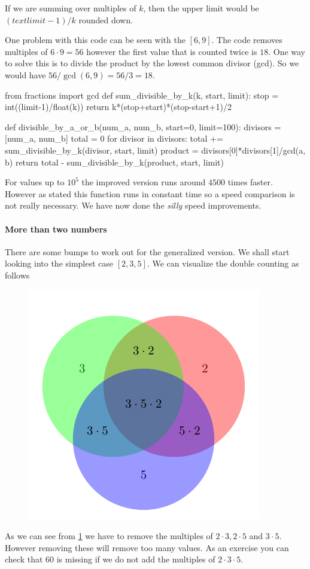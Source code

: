 If we are summing over multiples of $k$, then the upper limit would be $(text{limit}-1)/k$ rounded down.

One problem with this code can be seen with the $[6, 9]$. The code removes multiples of $6 \cdot 9 = 56$ however the 
first value that is counted twice is $18$. One way to solve this is to divide the product by the lowest common divisor (gcd). 
So we would have $56/\gcd(6,9) = 56/3 = 18$.
%	
\begin{pythoncode}
	from fractions import gcd
	def sum_divisible_by_k(k, start, limit):
    	stop = int((limit-1)/float(k))
    	return k*(stop+start)*(stop-start+1)/2

	def divisible_by_a_or_b(num_a, num_b, start=0, limit=100):
	    divisors = [num_a, num_b]
	    total = 0
	    for divisor in divisors:
	        total += sum_divisible_by_k(divisor, start, limit)
	    product = divisors[0]*divisors[1]/gcd(a, b)
	    return total - sum_divisible_by_k(product, start, limit)
\end{pythoncode}
%
For values up to $10^5$ the improved version runs around $4500$ times faster. However as stated this function runs in constant time
so a speed comparison is not really necessary. We have now done the \emph{silly} speed improvements. 
%
\paragraph*{More than two numbers}

There are some bumps to work out for the generalized version. We shall start looking into the simplest case $[2, 3, 5]$. We can visualize the double counting as follows
%
%
\begin{figure}[h!tbp]
	\includegraphics[scale=1, trim={0.25cm 0.25cm 0.25cm 0.75cm}, clip]{Images/Project-Euler-001-Venn-Diagram-3.pdf}
	\caption{}
	\label{fig:PE1-venn-3}
\end{figure}
% 
As we can see from \cref{fig:PE1-venn-3} we have to remove the multiples of $2\cdot 3, 2\cdot 5$ and $3 \cdot 5$. However removing these
will remove too many values. As an exercise you can check that $60$ is missing if we do not add the multiples of $2 \cdot 3 \cdot 5$. 

